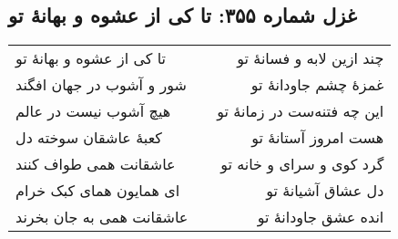 \begin{center}
\section*{غزل شماره ۳۵۵: تا کی از عشوه و بهانهٔ تو}
\label{sec:355}
\begin{longtable}{l p{0.5cm} r}
تا کی از عشوه و بهانهٔ تو
&&
چند ازین لابه و فسانهٔ تو
\\
شور و آشوب در جهان افگند
&&
غمزهٔ چشم جاودانهٔ تو
\\
هیچ آشوب نیست در عالم
&&
این چه فتنه‌ست در زمانهٔ تو
\\
کعبهٔ عاشقان سوخته دل
&&
هست امروز آستانهٔ تو
\\
عاشقانت همی طواف کنند
&&
گرد کوی و سرای و خانه تو
\\
ای همایون همای کبک خرام
&&
دل عشاق آشیانهٔ تو
\\
عاشقانت همی به جان بخرند
&&
انده عشق جاودانهٔ تو
\\
\end{longtable}
\end{center}
